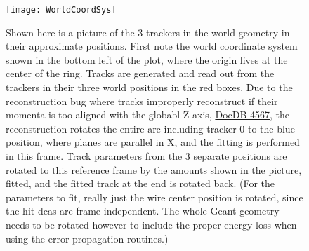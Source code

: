 	\begin{figure}[]
		\caption{Shown here is a picture of the 3 trackers in the world geometry in their approximate positions. First note the world coordinate system shown in the bottom left of the plot, where the origin lives at the center of the ring. Tracks are generated and read out from the trackers in their three world positions in the red boxes. Due to the reconstruction bug where tracks improperly reconstruct if their momenta is too aligned with the globabl Z axis, \href{http://gm2-docdb.fnal.gov:8080/cgi-bin/ShowDocument?docid=4567}{DocDB 4567}, the reconstruction rotates the entire arc including tracker 0 to the blue position, where planes are parallel in X, and the fitting is performed in this frame. Track parameters from the 3 separate positions are rotated to this reference frame by the amounts shown in the picture, fitted, and the fitted track at the end is rotated back. (For the parameters to fit, really just the wire center position is rotated, since the hit dcas are frame independent. The whole Geant geometry needs to be rotated however to include the proper energy loss when using the error propagation routines.)}
	\centering
	\texttt{[image: WorldCoordSys]}
	\label{fig:WorldCoordSys}
	\end{figure}


